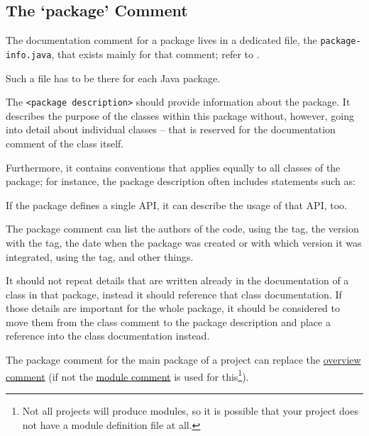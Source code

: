 \subsection{The ‘package’ Comment}\label{sec:PackageComment}
The documentation comment for a package lives in a dedicated file, the \texttt{package-info.java}, that exists mainly for that comment; refer to .

Such a file has to be there for each Java package.

The \texttt{<package description>} should provide information about the package. It describes the purpose of the classes within this package without, however, going into detail about individual classes – that is reserved for the documentation comment of the class itself.

Furthermore, it contains conventions that applies equally to all classes of the package; for instance, the package description often includes statements such as: 

If the package defines a single API, it can describe the usage of that API, too. 

The package comment can list the authors of the code, using the  tag, the version with the  tag, the date when the package was created or with which version it was integrated, using the  tag, and other things.

It should not repeat details that are written already in the documentation of a class in that package, instead it should reference that class documentation. If those details are  important for the whole package, it should be considered to move them from the class comment to the package description and place a reference into the class documentation instead.

The package comment for the main package of a project can replace the \hyperref[sec:OverviewDoc]{overview comment} (if not the \hyperref[sec:ModuleComment]{module comment} is used for this\footnote{Not all projects will produce modules, so it is possible that your project does not have a module definition file at all.}).


